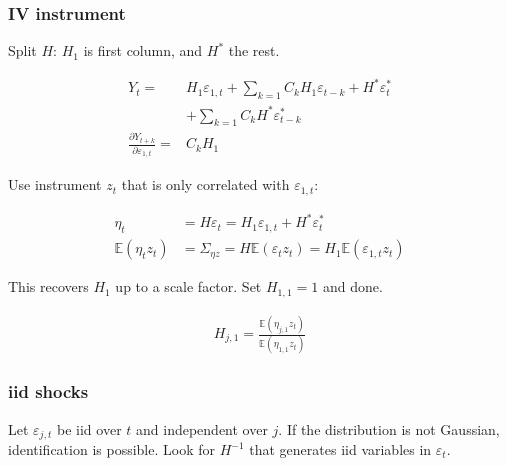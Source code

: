 \subsubsection{IV instrument}

Split $H$: $H_1$ is first column, and $H^*$ the rest.

\begin{align*}
    Y_t=&H_1 \varepsilon_{1, t}+\sum_{k=1} C_k H_1 \varepsilon_{t-k}+H^* \varepsilon_t^* \\
    &+\sum_{k=1} C_k H^* \varepsilon_{t-k}^* \\
    \frac{\partial Y_{t+k}}{\partial \varepsilon_{1, t}} =&C_k H_1
\end{align*}

Use instrument $z_t$ that is only correlated with $\varepsilon_{1,t}$:

\begin{align*}
    \eta_t&=H \varepsilon_t=H_1 \varepsilon_{1, t}+H^* \varepsilon_t^* \\
    \mathbb{E}\left(\eta_t z_t\right)&=\Sigma_{\eta z}=H \mathbb{E}\left(\varepsilon_t z_t\right)=H_1 \mathbb{E}\left(\varepsilon_{1, t} z_t\right)
\end{align*}

This recovers $H_1$ up to a scale factor. Set $H_{1,1} = 1$ and done.

\begin{align}
    H_{j, 1}=\frac{\mathbb{E}\left(\eta_{j, 1} z_t\right)}{\mathbb{E}\left(\eta_{1,1} z_t\right)}
\end{align}

\subsubsection{iid shocks}

Let $\varepsilon_{j,t}$ be iid over $t$ and independent over $j$. If the distribution is not Gaussian, identification is possible.
Look for $H^{-1}$ that generates iid variables in $\varepsilon_t$.